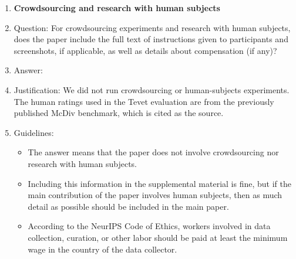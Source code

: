 \begin{enumerate}
\item {\bf Crowdsourcing and research with human subjects}
    \item[] Question: For crowdsourcing experiments and research with human subjects, does the paper include the full text of instructions given to participants and screenshots, if applicable, as well as details about compensation (if any)?
    \item[] Answer: \answerNA{}
    \item[] Justification: We did not run crowdsourcing or human-subjects experiments. The human ratings used in the Tevet evaluation are from the previously published McDiv benchmark, which is cited as the source.
    \item[] Guidelines:
    \begin{itemize}
        \item The answer \answerNA{} means that the paper does not involve crowdsourcing nor research with human subjects.
        \item Including this information in the supplemental material is fine, but if the main contribution of the paper involves human subjects, then as much detail as possible should be included in the main paper.
        \item According to the NeurIPS Code of Ethics, workers involved in data collection, curation, or other labor should be paid at least the minimum wage in the country of the data collector.
    \end{itemize}


\end{enumerate}
